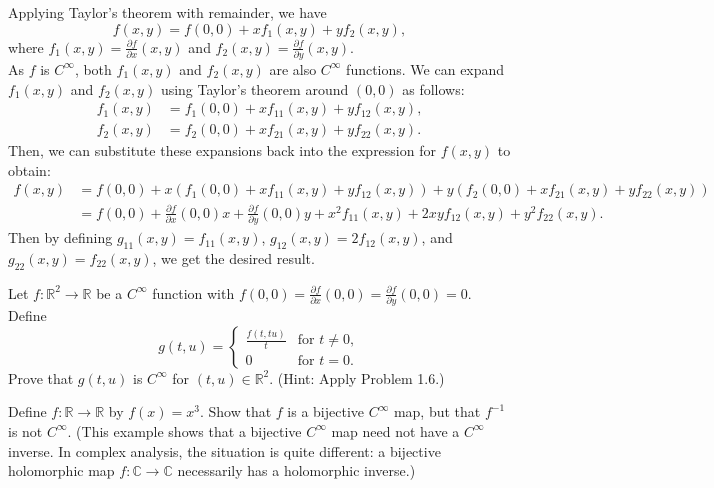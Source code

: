 \documentclass[en, oneside]{vivi}
\begin{document}
\begin{sol}
    Applying Taylor's theorem with remainder, we have
    \begin{equation*}
        f(x, y) = f(0, 0) + x f_1(x, y) + y f_2(x, y),
    \end{equation*}
    where $f_1(x, y) = \frac{\partial f}{\partial x}(x, y)$ and $f_2(x, y) = \frac{\partial f}{\partial y}(x, y)$.\\
    As $f$ is $C^\infty$, both $f_1(x, y)$ and $f_2(x, y)$ are also $C^\infty$ functions. We can expand $f_1(x, y)$ and $f_2(x, y)$ using Taylor's theorem around $(0, 0)$ as follows:
    \begin{align*}
        f_1(x, y) &= f_1(0, 0) + x f_{11}(x, y) + y f_{12}(x, y),\\
        f_2(x, y) &= f_2(0, 0) + x f_{21}(x, y) + y f_{22}(x, y).
    \end{align*}
    Then, we can substitute these expansions back into the expression for $f(x, y)$ to obtain:
    \begin{align*}
        f(x, y) &= f(0, 0) + x \left( f_1(0, 0) + x f_{11}(x, y) + y f_{12}(x, y) \right) + y \left( f_2(0, 0) + x f_{21}(x, y) + y f_{22}(x, y) \right)\\
        &= f(0, 0) + \frac{\partial f}{\partial x}(0, 0)x + \frac{\partial f}{\partial y}(0, 0)y + x^2 f_{11}(x, y) + 2xy f_{12}(x, y) + y^2 f_{22}(x, y).
    \end{align*}
    Then by defining $g_{11}(x, y) = f_{11}(x, y)$, $g_{12}(x, y) = 2f_{12}(x, y)$, and $g_{22}(x, y) = f_{22}(x, y)$, we get the desired result.
\end{sol}

\begin{prob}
    Let $f : \mathbb{R}^2 \to \mathbb{R}$ be a $C^\infty$ function with $f(0, 0) = \frac{\partial f}{\partial x}(0, 0) = \frac{\partial f}{\partial y}(0, 0) = 0$. Define
    \begin{equation*}
        g(t, u) =
        \begin{cases}
            \frac{f(t, tu)}{t} & \text{for } t \neq 0,\\
            0 & \text{for } t = 0.
        \end{cases}
    \end{equation*}
    Prove that $g(t, u)$ is $C^\infty$ for $(t, u) \in \mathbb{R}^2$. (Hint: Apply Problem 1.6.)
\end{prob}

\begin{prob}
    Define $f : \mathbb{R} \to \mathbb{R}$ by $f(x) = x^3$. Show that $f$ is a bijective $C^\infty$ map, but that $f^{-1}$ is not $C^\infty$. (This example shows that a bijective $C^\infty$ map need not have a $C^\infty$ inverse. In complex analysis, the situation is quite different: a bijective holomorphic map $f : \mathbb{C} \to \mathbb{C}$ necessarily has a holomorphic inverse.)
\end{prob}
\end{document}
